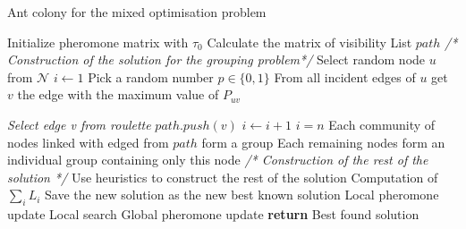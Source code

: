 \documentclass[UTF8, twoside]{EPURapport}
\begin{document}
\begin{algorithm}
  \caption{Ant colony for the mixed optimisation problem}
  \begin{algorithmic}[1]
  	  \State Initialize pheromone matrix with $\tau_0$
  	  \State Calculate the matrix of visibility
  	  \State List $path$
      		\State \textit{/* Construction of the solution for the grouping problem*/}
			\State Select random node $u$ from $\mathscr{N}$
    		\State $i \gets 1$
    		\Repeat
    			\State Pick a random number $p \in \{0,1\}$
    				\State From all incident edges of $u$ get $v$ the edge with the maximum value of $P_{uv}$
    				
				\Else
					\State \textit{Select edge v from roulette}
    			\EndIf
   					\State $path.push(v)$
   				\EndIf
   				\State $i \gets i+1$
    		\Until $i = n$
    		\State Each community of nodes linked with edged from $path$ form a group
    		\State Each remaining nodes form an individual group containing only this node
    		\State \textit{/* Construction of the rest of the solution */}
    		\State Use heuristics to construct the rest of the solution
    		\State Computation of $\underset{i}{\sum} L_i$
    			\State Save the new solution as the new best known solution
    		\EndIf
			\State Local pheromone update
        \EndFor
        \State Local search
        \State Global pheromone update
      \EndFor
      \State \textbf{return} Best found solution
  \end{algorithmic}
\end{algorithm}
\end{document}
